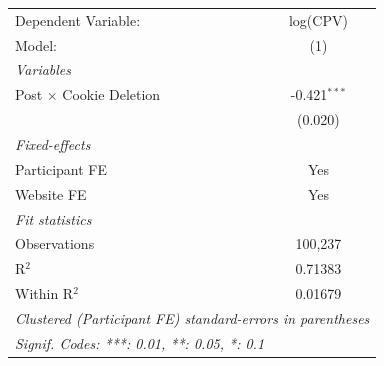 \begin{tabular}{lc}
   \tabularnewline \midrule \midrule
   Dependent Variable:            & log(CPV)\\  
   Model:                         & (1)\\  
   \midrule
   \emph{Variables}\\
   Post $\times$ Cookie Deletion  & -0.421$^{***}$\\   
                                  & (0.020)\\   
   \midrule
   \emph{Fixed-effects}\\
   Participant FE                 & Yes\\  
   Website FE                     & Yes\\  
   \midrule
   \emph{Fit statistics}\\
   Observations                   & 100,237\\  
   R$^2$                          & 0.71383\\  
   Within R$^2$                   & 0.01679\\  
   \midrule \midrule
   \multicolumn{2}{l}{\emph{Clustered (Participant FE) standard-errors in parentheses}}\\
   \multicolumn{2}{l}{\emph{Signif. Codes: ***: 0.01, **: 0.05, *: 0.1}}\\
\end{tabular}
